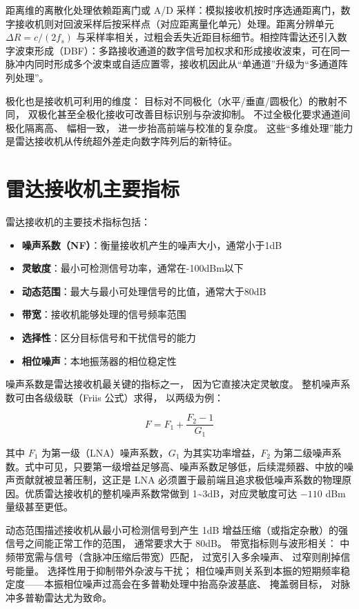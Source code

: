 距离维的离散化处理依赖距离门或 A/D 采样：模拟接收机按时序选通距离门，数字接收机则对回波采样后按采样点（对应距离量化单元）处理。距离分辨单元 $\Delta R=c/(2f_s)$ 与采样率相关，过粗会丢失近距目标细节。相控阵雷达还引入数字波束形成（DBF）：多路接收通道的数字信号加权求和形成接收波束，可在同一脉冲内同时形成多个波束或自适应置零，接收机因此从“单通道”升级为“多通道阵列处理”。

极化也是接收机可利用的维度：
目标对不同极化（水平/垂直/圆极化）的散射不同，
双极化甚至全极化接收可改善目标识别与杂波抑制。
不过全极化要求通道间极化隔离高、
幅相一致，
进一步抬高前端与校准的复杂度。
这些“多维处理”能力是雷达接收机从传统超外差走向数字阵列后的新特征。

\section{雷达接收机主要指标}
\label{sec:radar_specifications}

雷达接收机的主要技术指标包括：

\begin{itemize}
    \item \textbf{噪声系数（NF）}：衡量接收机产生的噪声大小，通常小于1dB
    \item \textbf{灵敏度}：最小可检测信号功率，通常在-100dBm以下
    \item \textbf{动态范围}：最大与最小可处理信号的比值，通常大于80dB
    \item \textbf{带宽}：接收机能够处理的信号频率范围
    \item \textbf{选择性}：区分目标信号和干扰信号的能力
    \item \textbf{相位噪声}：本地振荡器的相位稳定性
\end{itemize}

噪声系数是雷达接收机最关键的指标之一，
因为它直接决定灵敏度。
整机噪声系数可由各级级联（Friis 公式）求得，
以两级为例：

\[
F=F_1+\frac{F_2-1}{G_1}
\]

其中 $F_1$ 为第一级（LNA）噪声系数，$G_1$ 为其实功率增益，$F_2$ 为第二级噪声系数。式中可见，只要第一级增益足够高、噪声系数足够低，后续混频器、中放的噪声贡献就被显著压制，这正是 LNA 必须置于最前端且追求极低噪声系数的物理原因。优质雷达接收机的整机噪声系数常做到 1\sim3dB，对应灵敏度可达 $-110$ dBm 量级甚至更低。

动态范围描述接收机从最小可检测信号到产生 1dB 增益压缩（或指定杂散）的强信号之间能正常工作的范围，
通常要求大于 80dB。
带宽指标则与波形相关：
中频带宽需与信号（含脉冲压缩后带宽）匹配，
过宽引入多余噪声、
过窄则削掉信号能量。
选择性用于抑制带外杂波与干扰；
相位噪声则关系到本振的短期频率稳定度——本振相位噪声过高会在多普勒处理中抬高杂波基底、
掩盖弱目标，
对脉冲多普勒雷达尤为致命。

